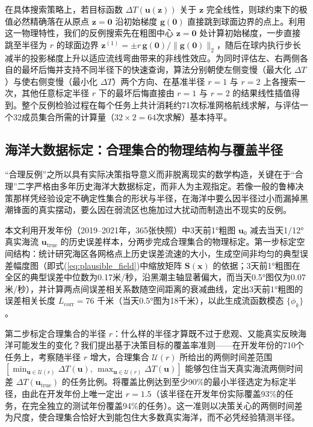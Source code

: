 在具体搜索策略上，若目标函数 $\Delta T(\boldsymbol{u}(\boldsymbol{z}))$ 关于 $\boldsymbol{z}$ 完全线性，则球约束下的极值必然精确落在从原点 $\boldsymbol{z}=\boldsymbol{0}$ 沿初始梯度 $\boldsymbol{g}(\boldsymbol{0})$ 直接跳到球面边界的点上。利用这一物理特性，我们的反例搜索先在粗图中心 $\boldsymbol{z}=\boldsymbol{0}$ 处计算初始梯度，一步直接跳至半径为 $r$ 的球面边界 $\boldsymbol{z}^{(1)} = \pm r\, \boldsymbol{g}(\boldsymbol{0}) / \|\boldsymbol{g}(\boldsymbol{0})\|_2$，随后在球内执行步长减半的投影梯度上升以适应流线弯曲带来的非线性效应。为同时评估左、右两侧各自的最坏后悔并支持不同半径下的快速查询，算法分别朝使左侧变慢（最大化 $\Delta T$）与使右侧变慢（最小化 $\Delta T$）两个方向、在基准半径 $r=1$ 与 $r=2$ 上各搜索一次，其他任意标定半径 $r$ 下的最坏后悔直接由 $r=1$ 与 $r=2$ 的结果线性插值得到。整个反例检验过程在每个任务上共计消耗约71次标准网格航线求解，与评估一个32成员集合所需的计算量（$32 \times 2 = 64$次求解）基本持平。

\subsection{海洋大数据标定：合理集合的物理结构与覆盖半径}
“合理反例”之所以具有实际决策指导意义而非脱离现实的数学构造，关键在于“合理”二字严格由多年历史海洋大数据标定，而非人为主观指定。若像一般的鲁棒决策那样凭经验设定不确定性集合的形状与半径\cite{benhaim2006infogap}，在海洋中要么因半径过小而漏掉黑潮锋面的真实摆动，要么因在弱流区也施加过大扰动而制造出不现实的反例。

本文利用开发年份（2019--2021年，365张快照）中3天前1°粗图 $\boldsymbol{u}_0$ 减去当天1/12°真实海流 $\boldsymbol{u}_{\text{true}}$ 的历史误差样本，分两步完成合理集合的物理标定。第一步标定空间结构：统计研究海区各网格点上历史误差流速的大小，生成空间非均匀的典型误差幅度图（即式(\ref{eq:plausible_field})中缩放矩阵 $\mathbf{S}(\boldsymbol{x})$ 的依据；3天前1°粗图在全区的典型误差中位数为0.17米/秒，沿黑潮主轴显著偏大，而当天0.5°图仅为0.07米/秒），并计算两点间误差相关系数随空间距离的衰减曲线，定出3天前1°粗图的误差相关长度 $L_{\text{corr}} = 76$ 千米（当天0.5°图为18千米），以此生成流函数模态 $\{\phi_k\}$。

第二步标定合理集合的半径 $r$：什么样的半径才算既不过于悲观、又能真实反映海洋可能发生的变化？我们提出基于决策目标的覆盖率准则——在开发年份的710个任务上，考察随半径 $r$ 增大，合理集合 $\mathcal{U}(r)$ 所给出的两侧时间差范围 $[\min_{\boldsymbol{u}\in\mathcal{U}(r)}\Delta T(\boldsymbol{u}),\, \max_{\boldsymbol{u}\in\mathcal{U}(r)}\Delta T(\boldsymbol{u})]$ 能够包住当天真实海流两侧时间差 $\Delta T(\boldsymbol{u}_{\text{true}})$ 的任务比例。将覆盖比例达到至少90\%的最小半径选定为标定半径，由此在开发年份上唯一定出 $r = 1.5$（该半径在开发年份实际覆盖93\%的任务，在完全独立的测试年份覆盖94\%的任务）。这一准则以决策关心的两侧时间差为尺度，使合理集合恰好大到能包住大多数真实海洋，而不必凭经验猜测半径。


